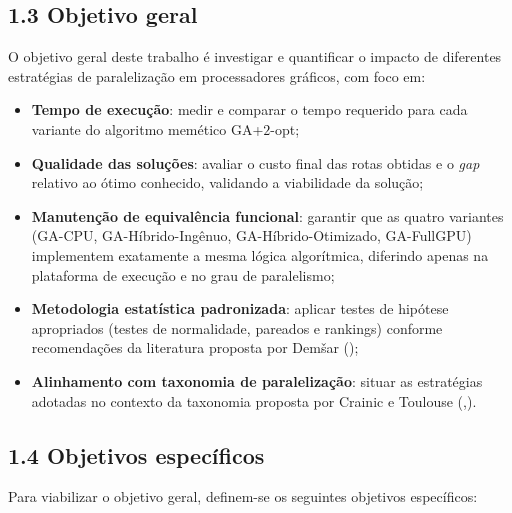 \subsection{1.3 Objetivo geral}\label{sec-13-objetivo-geral}

O objetivo geral deste trabalho é investigar e quantificar o impacto de
diferentes estratégias de paralelização em processadores gráficos, com
foco em:

\begin{itemize}
\tightlist
\item
  \textbf{Tempo de execução}: medir e comparar o tempo requerido para
  cada variante do algoritmo memético GA+\(2\)-opt;
\item
  \textbf{Qualidade das soluções}: avaliar o custo final das rotas
  obtidas e o \emph{gap} relativo ao ótimo conhecido, validando a
  viabilidade da solução;
\item
  \textbf{Manutenção de equivalência funcional}: garantir que as quatro
  variantes (GA-CPU, GA-Híbrido-Ingênuo, GA-Híbrido-Otimizado,
  GA-FullGPU) implementem exatamente a mesma lógica algorítmica,
  diferindo apenas na plataforma de execução e no grau de paralelismo;
\item
  \textbf{Metodologia estatística padronizada}: aplicar testes de
  hipótese apropriados (testes de normalidade, pareados e rankings)
  conforme recomendações da literatura proposta por Demšar
  ();
\item
  \textbf{Alinhamento com taxonomia de paralelização}: situar as
  estratégias adotadas no contexto da taxonomia proposta por Crainic e
  Toulouse
  (,).
\end{itemize}

\subsection{1.4 Objetivos
específicos}\label{sec-14-objetivos-especificos}

Para viabilizar o objetivo geral, definem-se os seguintes objetivos
específicos:

